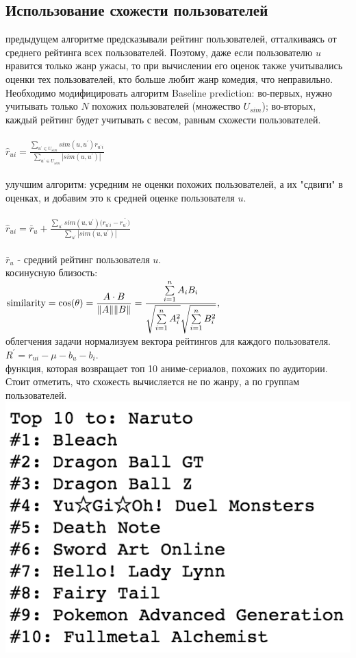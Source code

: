 \documentclass{article}
\newcommand\tab[1][1cm]{\hspace*{#1}}
\begin{document}
\subsection{Использование схожести пользователей}
 предыдущем алгоритме предсказывали рейтинг пользователей, отталкиваясь от среднего рейтинга всех пользователей. Поэтому, даже если пользователю $u$ нравится только жанр ужасы, то при вычислении его оценок также учитывались оценки тех пользователей, кто больше любит жанр комедия, что неправильно. Необходимо модифицировать алгоритм Baseline prediction: во-первых, нужно учитывать только $N$ похожих пользователей (множество $U_{sim}$); во-вторых, каждый рейтинг будет учитывать с весом, равным схожести пользователей.\\
\\
\tab$\hat{r}_{ui}=\frac{\sum_{u^\prime \in U_{sim}}sim(u,u^\prime)r_{u^\prime{}i}}{\sum_{u^\prime\in U_{sim}}|sim(u,u^\prime)|}$\\
\\
 улучшим алгоритм: усредним не оценки похожих пользователей, а их "сдвиги" в оценках, и добавим это к средней оценке пользователя $u$.\\
\\
\tab$\hat{r}_{ui}=\bar{r}_u+\frac{\sum_{u^\prime}sim(u,u^\prime)(r_{u^\prime{}i}-\bar{r_{u^\prime})}}{\sum_{u^\prime}|sim(u,u^\prime)|}$\\
\\
 $\bar{r}_u$ - средний рейтинг пользователя $u$.\\
 косинусную близость:\\
\tab${\displaystyle {\text{similarity}}=\cos(\theta )={ A  \cdot  B   \over \| A  \|\| B \|}={\frac {\sum \limits _{i=1}^{n}{A_{i}B_{i}}}{{\sqrt {\sum \limits _{i=1}^{n}{A_{i}^{2}}}}{\sqrt {\sum \limits _{i=1}^{n}{B_{i}^{2}}}}}},}$\\
 облегчения задачи нормализуем вектора рейтингов для каждого пользователя.\\
\tab$R^\prime=r_{ui}-\mu-b_u-b_i.$\\
 функция, которая возвращает топ 10 аниме-сериалов, похожих по аудитории. Стоит отметить, что схожесть вычисляется не по жанру, а по группам пользователей.\\
\tab\includegraphics[scale=0.8]{f16.png}\\
\end{document}

